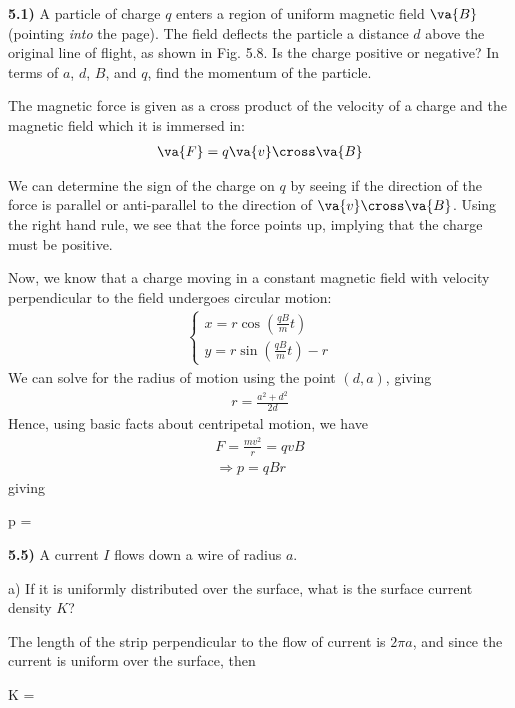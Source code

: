 \documentclass[12pt,a4paper]{article}
\newcommand{\prob}[2]{\textbf{#1)} #2}
\begin{document}
\prob{5.1}{A particle of charge $q$ enters a region of uniform magnetic field $\va{B}$ (pointing \textit{into} the page). The field deflects the particle a distance $d$ above the original line of flight, as shown in Fig. 5.8. Is the charge positive or negative? In terms of $a$, $d$, $B$, and $q$, find the momentum of the particle.}

The magnetic force is given as a cross product of the velocity of a charge and the magnetic field which it is immersed in:
\begin{align*}
\va{F} = q\va{v} \cross \va{B}
\end{align*}

We can determine the sign of the charge on $q$ by seeing if the direction of the force is parallel or anti-parallel to the direction of $\va{v} \cross \va{B}$. Using the right hand rule, we see that the force points up, implying that the charge must be positive.

Now, we know that a charge moving in a constant magnetic field with velocity perpendicular to the field undergoes circular motion:
\begin{align*}
\begin{cases}
x = r\cos(\frac{qB}{m}t) \\
y = r\sin(\frac{qB}{m}t) - r
\end{cases}
\end{align*}
We can solve for the radius of motion using the point $(d,a)$, giving
\begin{align*}
r = \frac{a^2 + d^2}{2d}
\end{align*}
Hence, using basic facts about centripetal motion, we have
\begin{align*}
F = \frac{mv^2}{r} = qvB \\
\Rightarrow p = qBr
\end{align*}
giving
\begin{eqbox}
p = 
\end{eqbox}

\prob{5.5}{A current $I$ flows down a wire of radius $a$.}

a) If it is uniformly distributed over the surface, what is the surface current density $K$?

The length of the strip perpendicular to the flow of current is $2 \pi a$, and since the current is uniform over the surface, then 
\begin{eqbox}
K = 
\end{eqbox}
\end{document}
